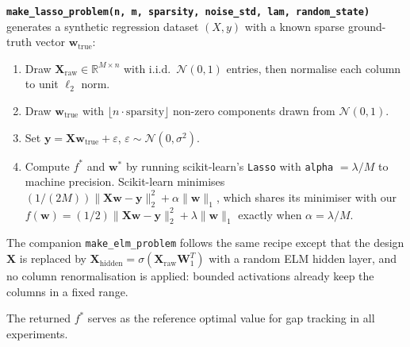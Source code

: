 \textbf{\texttt{make\_lasso\_problem(n, m, sparsity, noise\_std, lam, random\_state)}}
generates a synthetic regression dataset $(X, y)$ with a known sparse ground-truth
vector $\mathbf{w}_{\mathrm{true}}$:
\begin{enumerate}[nosep]
    \item Draw $\mathbf{X}_{\mathrm{raw}} \in \mathbb{R}^{M \times n}$ with i.i.d.\
    $\mathcal{N}(0,1)$ entries, then normalise each column to unit $\ell_2$ norm.
    \item Draw $\mathbf{w}_{\mathrm{true}}$ with $\lfloor n \cdot \mathrm{sparsity}\rfloor$
    non-zero components drawn from $\mathcal{N}(0,1)$.
    \item Set $\mathbf{y} = \mathbf{X}\mathbf{w}_{\mathrm{true}} + \varepsilon$,
    $\varepsilon \sim \mathcal{N}(0, \sigma^2)$.
    \item Compute $f^*$ and $\mathbf{w}^*$ by running scikit-learn's \texttt{Lasso}
    with \texttt{alpha} $= \lambda/M$ to machine precision. Scikit-learn minimises
    $(1/(2M))\|\mathbf{Xw} - \mathbf{y}\|_2^2 + \alpha\|\mathbf{w}\|_1$, which shares
    its minimiser with our $f(\mathbf{w}) = (1/2)\|\mathbf{Xw} - \mathbf{y}\|_2^2 +
    \lambda\|\mathbf{w}\|_1$ exactly when $\alpha = \lambda/M$.
\end{enumerate}
The companion \texttt{make\_elm\_problem} follows the same recipe except that
the design $\mathbf{X}$ is replaced by $\mathbf{X}_{\mathrm{hidden}} =
\sigma(\mathbf{X}_{\mathrm{raw}}\mathbf{W}_1^T)$ with a random ELM hidden layer,
and no column renormalisation is applied: bounded activations already keep the
columns in a fixed range.

The returned $f^*$ serves as the reference optimal value for gap tracking in all
experiments.
